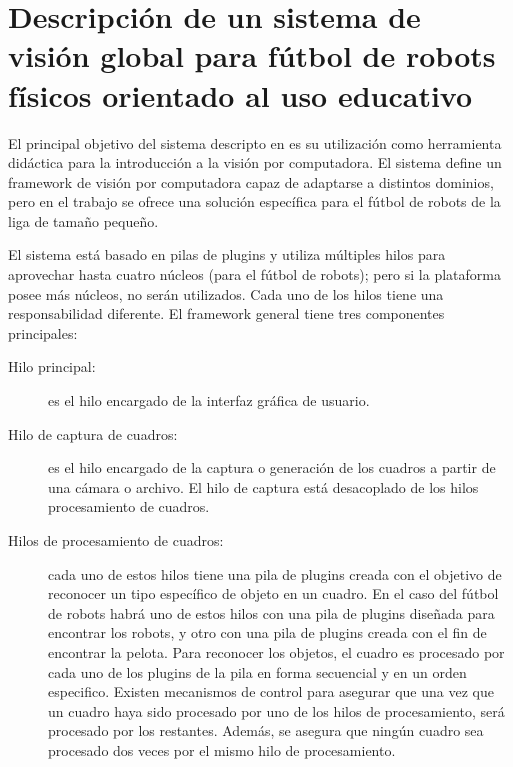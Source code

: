 
\section{Descripción de un sistema de visión global para fútbol de robots físicos
orientado al uso educativo}


\label{descripcionSistemaBase}

El principal objetivo del sistema descripto en \cite{torres2014} es su
utilización como herramienta didáctica para la introducción a la visión por
computadora. El sistema define un framework de visión por computadora capaz de
adaptarse a distintos dominios, pero en el trabajo se ofrece una solución
específica para el fútbol de robots de la liga de tamaño pequeño.

El sistema está basado en pilas de plugins y utiliza múltiples hilos para
aprovechar hasta cuatro núcleos (para el fútbol de robots); pero si la
plataforma posee más núcleos, no serán utilizados. Cada uno de los hilos tiene
una responsabilidad diferente. El framework general tiene tres componentes
principales:

\begin{description}

	\item[Hilo principal:] es el hilo encargado de la interfaz gráfica de
		usuario.

	\item[Hilo de captura de cuadros:] es el hilo encargado de la captura o
		generación de los cuadros a partir de una cámara o archivo. El
		hilo de captura está desacoplado de los hilos procesamiento de
		cuadros.

	\item[Hilos de procesamiento de cuadros:] cada uno de estos hilos tiene
		una pila de plugins creada con el objetivo de reconocer un tipo
		específico de objeto en un cuadro. En el caso del fútbol de
		robots habrá uno de estos hilos con una pila de plugins diseñada
		para encontrar los robots, y otro con una pila de plugins creada
		con el fin de encontrar la pelota. Para reconocer los objetos,
		el cuadro es procesado por cada uno de los plugins de la pila en
		forma secuencial y en un orden especifico. Existen mecanismos de
		control para asegurar que una vez que un cuadro haya sido procesado por
		uno de los hilos de procesamiento, será procesado por los
		restantes. Además, se asegura que ningún cuadro sea procesado
		dos veces por el mismo hilo de procesamiento.

\end{description}

